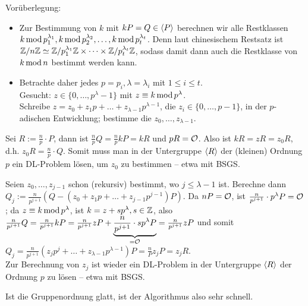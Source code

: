 \begin{bem}
	Vorüberlegung:
	\begin{itemize}
		\item Zur Bestimmung von $k$ mit $kP = Q \in \langle P\rangle$ berechnen wir alle Restklassen $k \operatorname{mod} p_1^{\lambda_1}, k \operatorname{mod} p_2^{\lambda_2}, \dots, k \operatorname{mod} p_t^{\lambda_t}$.
		Denn laut chinesischem Restsatz ist $\mathbb{Z}/n\mathbb{Z} \simeq \mathbb{Z}/p_1^{\lambda_1} \mathbb{Z} \times \dots \times \mathbb{Z} / p_t^{\lambda_t} \mathbb{Z}$, sodass damit dann auch die Restklasse von $k \operatorname{mod} n$ bestimmt werden kann.
		\item Betrachte daher jedes $p = p_i, \lambda = \lambda_i$ mit $1 \leq  i \leq t$. \\
		Gesucht: $z \in \{0, \dots, p^\lambda - 1\}$ mit $z \equiv k \operatorname{mod} p^\lambda$. \\
		Schreibe $z = z_0 + z_1 p + \dots + z_{\lambda-1} p^{\lambda-1}$, die $z_i \in \{0, \dots, p-1\}$, in der $p$-adischen Entwicklung; bestimme die $z_0, \dots, z_{\lambda-1}$.
	\end{itemize}
\end{bem}

\begin{anw}[Schritt 1]
	Sei $R := \frac{n}{p} \cdot P$, dann ist $\frac{n}{p}Q = \frac{n}{p}kP = kR$ und $pR = \mathcal{O}$.
	Also ist $kR = zR = z_0 R$, d.h. $z_0 R = \frac{n}{p} \cdot Q$.
	Somit muss man in der Untergruppe $\langle R\rangle$ der (kleinen) Ordnung $p$ ein DL-Problem lösen, um $z_0$ zu bestimmen -- etwa mit BSGS.
\end{anw}

\begin{anw}[Schritt 2]
	Seien $z_0, \dots, z_{j-1}$ schon (rekursiv) bestimmt, wo $j \leq \lambda-1$ ist.
	Berechne dann $Q_j := \frac{n}{p^{j+1}} (Q - (z_0 + z_1p + \dots + z_{j-1} p^{j-1}) P)$. Da $nP = \mathcal{O}$, ist $\frac{n}{p^{j+1}} \cdot p^\lambda P = \mathcal{O}$; da $z \equiv k \operatorname{mod} p^\lambda$, ist $k = z + sp^\lambda, s \in \mathbb{Z}$, also $\frac{n}{p^{j+1}} Q = \frac{n}{p^{j+1}} k P = \frac{n}{p^{j+1}} zP + \underbrace{\frac{n}{p^{j+1}} \cdot sp^\lambda P}_{=\mathcal{O}} = \frac{n}{p^{j+1}} zP$ und somit $Q_j = \frac{n}{p^{j+1}} (z_j p^j + \dots + z_{\lambda - 1} p^{\lambda-1}) P = \frac{n}{P} z_j P = z_j R$. \\
	Zur Berechnung von $z_j$ ist wieder ein DL-Problem in der Untergruppe $\langle R\rangle$ der Ordnung $p$ zu lösen -- etwa mit BSGS.
\end{anw}

\begin{bem}
	Ist die Gruppenordnung glatt, ist der Algorithmus also sehr schnell.
\end{bem}

